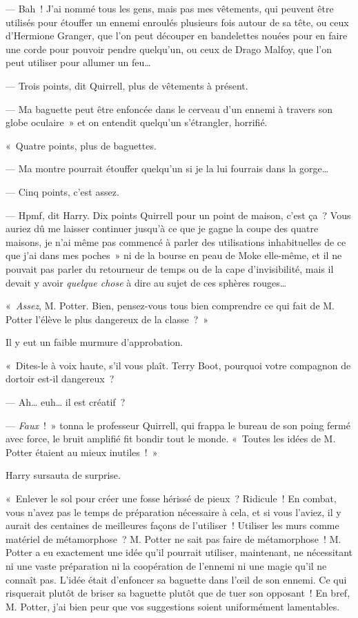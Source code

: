 --- Bah~! J'ai nommé tous les gens, mais pas mes vêtements, qui peuvent être utilisés pour étouffer un ennemi enroulés plusieurs fois autour de sa tête, ou ceux d'Hermione Granger, que l'on peut découper en bandelettes nouées pour en faire une corde pour pouvoir pendre quelqu'un, ou ceux de Drago Malfoy, que l'on peut utiliser pour allumer un feu…

--- Trois points, dit Quirrell, plus de vêtements à présent.

--- Ma baguette peut être enfoncée dans le cerveau d'un ennemi à travers son globe oculaire~» et on entendit quelqu'un s'étrangler, horrifié.

«~Quatre points, plus de baguettes.

--- Ma montre pourrait étouffer quelqu'un si je la lui fourrais dans la gorge…

--- Cinq points, c'est assez.

--- Hpmf, dit Harry. Dix points Quirrell pour un point de maison, c'est ça~?
Vous auriez dû me laisser continuer jusqu'à ce que je gagne la coupe des quatre maisons, je n'ai même pas commencé à parler des utilisations inhabituelles de ce que j'ai dans mes poches~» ni de la bourse en peau de Moke elle-même, et il ne pouvait pas parler du retourneur de temps ou de la cape d'invisibilité, mais il devait y avoir \emph{quelque chose} à dire au sujet de ces sphères rouges…

«~\emph{Assez}, M. Potter.
Bien, pensez-vous tous bien comprendre ce qui fait de M. Potter l'élève le plus dangereux de la classe~?~»

Il y eut un faible murmure d'approbation.

«~Dites-le à voix haute, s'il vous plaît.
Terry Boot, pourquoi votre compagnon de dortoir est-il dangereux~?

--- Ah… euh… il est créatif~?

--- \emph{Faux}~!~» tonna le professeur Quirrell, qui frappa le bureau de son poing fermé avec force, le bruit amplifié fit bondir tout le monde.
«~Toutes les idées de M. Potter étaient au mieux inutiles~!~»

Harry sursauta de surprise.

«~Enlever le sol pour créer une fosse hérissé de pieux~?
Ridicule~!
En combat, vous n'avez pas le temps de préparation nécessaire à cela, et si vous l'aviez, il y aurait des centaines de meilleures façons de l'utiliser~!
Utiliser les murs comme matériel de métamorphose~?
M. Potter ne sait pas faire de métamorphose~!
M. Potter a eu exactement une idée qu'il pourrait utiliser, maintenant, ne nécessitant ni une vaste préparation ni la coopération de l'ennemi ni une magie qu'il ne connaît pas.
L'idée était d'enfoncer sa baguette dans l'œil de son ennemi.
Ce qui risquerait plutôt de briser sa baguette plutôt que de tuer son opposant~!
En bref, M. Potter, j'ai bien peur que vos suggestions soient uniformément lamentables.

